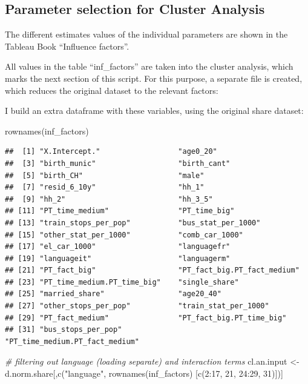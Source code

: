 \documentclass[
]{article}
\newenvironment{Shaded}{\begin{snugshade}}{\end{snugshade}}
\newcommand{\CommentTok}[1]{\textcolor[rgb]{0.56,0.35,0.01}{\textit{#1}}}
\newcommand{\DecValTok}[1]{\textcolor[rgb]{0.00,0.00,0.81}{#1}}
\newcommand{\FunctionTok}[1]{\textcolor[rgb]{0.00,0.00,0.00}{#1}}
\newcommand{\NormalTok}[1]{#1}
\newcommand{\OtherTok}[1]{\textcolor[rgb]{0.56,0.35,0.01}{#1}}
\newcommand{\SpecialCharTok}[1]{\textcolor[rgb]{0.00,0.00,0.00}{#1}}
\newcommand{\StringTok}[1]{\textcolor[rgb]{0.31,0.60,0.02}{#1}}
\begin{document}
\hypertarget{parameter-selection-for-cluster-analysis}{%
\subsection{Parameter selection for Cluster
Analysis}\label{parameter-selection-for-cluster-analysis}}

The different estimates values of the individual parameters are shown in
the Tableau Book ``Influence factors''.

All values in the table ``inf\_factors'' are taken into the cluster
analysis, which marks the next section of this script. For this purpose,
a separate file is created, which reduces the original dataset to the
relevant factors:

I build an extra dataframe with these variables, using the original
share dataset:

\begin{Shaded}
\begin{Highlighting}[]
\FunctionTok{rownames}\NormalTok{(inf\_factors)}
\end{Highlighting}
\end{Shaded}

\begin{verbatim}
##  [1] "X.Intercept."                  "age0_20"                      
##  [3] "birth_munic"                   "birth_cant"                   
##  [5] "birth_CH"                      "male"                         
##  [7] "resid_6_10y"                   "hh_1"                         
##  [9] "hh_2"                          "hh_3_5"                       
## [11] "PT_time_medium"                "PT_time_big"                  
## [13] "train_stops_per_pop"           "bus_stat_per_1000"            
## [15] "other_stat_per_1000"           "comb_car_1000"                
## [17] "el_car_1000"                   "languagefr"                   
## [19] "languageit"                    "languagerm"                   
## [21] "PT_fact_big"                   "PT_fact_big.PT_fact_medium"   
## [23] "PT_time_medium.PT_time_big"    "single_share"                 
## [25] "married_share"                 "age20_40"                     
## [27] "other_stops_per_pop"           "train_stat_per_1000"          
## [29] "PT_fact_medium"                "PT_fact_big.PT_time_big"      
## [31] "bus_stops_per_pop"             "PT_time_medium.PT_fact_medium"
\end{verbatim}

\begin{Shaded}
\begin{Highlighting}[]
\CommentTok{\# filtering out language (loading separate) and interaction terms}
\NormalTok{cl.an.input }\OtherTok{\textless{}{-}}\NormalTok{ d.norm.share[,}\FunctionTok{c}\NormalTok{(}\StringTok{"language"}\NormalTok{, }\FunctionTok{rownames}\NormalTok{(inf\_factors)}
\NormalTok{                               [}\FunctionTok{c}\NormalTok{(}\DecValTok{2}\SpecialCharTok{:}\DecValTok{17}\NormalTok{, }\DecValTok{21}\NormalTok{, }\DecValTok{24}\SpecialCharTok{:}\DecValTok{29}\NormalTok{, }\DecValTok{31}\NormalTok{)])]}
\end{Highlighting}
\end{Shaded}
\end{document}
